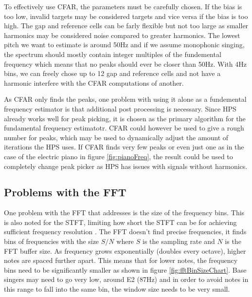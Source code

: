 To effectively use CFAR, the parameters must be carefully chosen. If the bias is too low, invalid targets may be considered targets and vice versa if the bias is too high. The gap and reference cells can be farly flexible but not too large as smaller harmonics may be considered noise compared to greater harmonics. The lowest pitch we want to estimate is around 50Hz and if we assume monophonic singing, the spectrum should mostly contain integer multiples of the fundemental frequency which means that no peaks should ever be closer than 50Hz. With 4Hz bins, we can freely chose up to 12 gap and reference cells and not have a harmonic interfere with the CFAR computations of another. 

As CFAR only finds the peaks, one problem with using it alone as a fundemental frequency estimator is that additional post processing is necessary. Since HPS already works well for peak picking, it is chosen as the primary algorithm for the fundamental frequency estimatotr. CFAR could however be used to give a rough number for peaks, which may be used to dynamically adjust the amount of iterations the HPS uses. If CFAR finds very few peaks or even just one as in the case of the electric piano in figure \ref{fig:pianoFreq}, the result could be used to completely change peak picker as HPS has issues with signals without harmonics.

\subsection{Problems with the FFT}
One problem with the FFT that \cite{Gotsopoulos} addresses is the size of the frequency bins. This is also noted for the STFT, limiting how short the STFT can be for achieving sufficient frequency resolution \cite{Evans2012}. The FFT doesn't find precise frequencies, it finds bins of frequencies with the size $S/N$ where $S$ is the sampling rate and $N$ is the FFT buffer size. As frequency grows exponentially (doubles every octave), higher notes are spaced further apart. This means that for lower notes, the frequency bins need to be significantly smaller as shown in figure \ref{fig:fftBinSizeChart}. Base singers may need to go very low, around E2 (87Hz) and in order to avoid notes in this range to fall into the same bin, the window size needs to be very small.  

